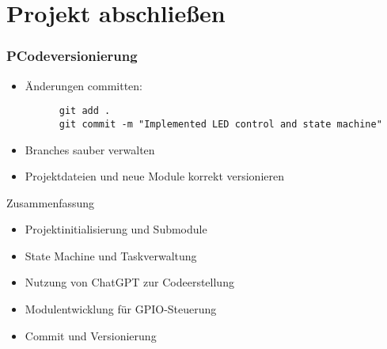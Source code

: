 \documentclass{beamer}
\begin{document}
\section{Projekt abschließen}
\begin{frame}[fragile]\frametitle{PCodeversionierung}
  \begin{itemize}
    \item Änderungen committen:
    \begin{verbatim}
      git add .
      git commit -m "Implemented LED control and state machine"
    \end{verbatim}
    \item Branches sauber verwalten
    \item Projektdateien und neue Module korrekt versionieren
  \end{itemize}
\end{frame}

\begin{frame}{Zusammenfassung}
  \begin{itemize}
    \item Projektinitialisierung und Submodule
    \item State Machine und Taskverwaltung
    \item Nutzung von ChatGPT zur Codeerstellung
    \item Modulentwicklung für GPIO-Steuerung
    \item Commit und Versionierung
  \end{itemize}
\end{frame}
\end{document}
